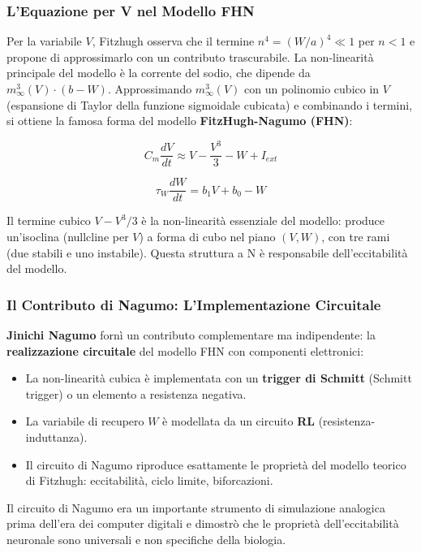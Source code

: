 \subsubsection{L'Equazione per V nel Modello FHN}

Per la variabile $V$, Fitzhugh osserva che il termine $n^4 = (W/a)^4 \ll 1$ per $n < 1$ e propone di approssimarlo con un contributo trascurabile. La non-linearità principale del modello è la corrente del sodio, che dipende da $m_\infty^3(V) \cdot (b - W)$. Approssimando $m_\infty^3(V)$ con un polinomio cubico in $V$ (espansione di Taylor della funzione sigmoidale cubicata) e combinando i termini, si ottiene la famosa forma del modello \textbf{FitzHugh-Nagumo (FHN)}:

\begin{equation}
C_m \frac{dV}{dt} \approx V - \frac{V^3}{3} - W + I_{ext}
\end{equation}

\begin{equation}
\tau_W \frac{dW}{dt} = b_1 V + b_0 - W
\end{equation}

Il termine cubico $V - V^3/3$ è la non-linearità essenziale del modello: produce un'isoclina (nullcline per $V$) a forma di cubo nel piano $(V, W)$, con tre rami (due stabili e uno instabile). Questa struttura a N è responsabile dell'eccitabilità del modello.

\subsubsection{Il Contributo di Nagumo: L'Implementazione Circuitale}

\textbf{Jinichi Nagumo} fornì un contributo complementare ma indipendente: la \textbf{realizzazione circuitale} del modello FHN con componenti elettronici:
\begin{itemize}
    \item La non-linearità cubica è implementata con un \textbf{trigger di Schmitt} (Schmitt trigger) o un elemento a resistenza negativa.
    \item La variabile di recupero $W$ è modellata da un circuito \textbf{RL} (resistenza-induttanza).
    \item Il circuito di Nagumo riproduce esattamente le proprietà del modello teorico di Fitzhugh: eccitabilità, ciclo limite, biforcazioni.
\end{itemize}

Il circuito di Nagumo era un importante strumento di simulazione analogica prima dell'era dei computer digitali e dimostrò che le proprietà dell'eccitabilità neuronale sono universali e non specifiche della biologia.



